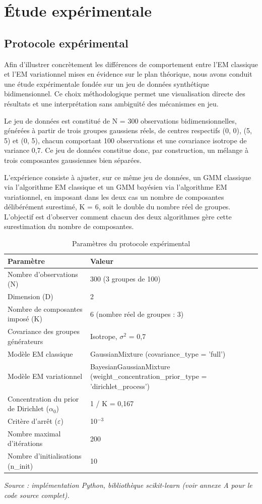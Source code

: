 \section{Étude expérimentale}
\subsection{Protocole expérimental}
Afin d'illustrer concrètement les différences de comportement entre l'EM classique et l'EM variationnel mises en évidence sur le plan théorique, nous avons conduit une étude expérimentale fondée sur un jeu de données synthétique bidimensionnel. Ce choix méthodologique permet une visualisation directe des résultats et une interprétation sans ambiguïté des mécanismes en jeu.

Le jeu de données est constitué de N = 300 observations bidimensionnelles, générées à partir de trois groupes gaussiens réels, de centres respectifs (0, 0), (5, 5) et (0, 5), chacun comportant 100 observations et une covariance isotrope de variance 0,7. Ce jeu de données constitue donc, par construction, un mélange à trois composantes gaussiennes bien séparées.

L'expérience consiste à ajuster, sur ce même jeu de données, un GMM classique via l'algorithme EM classique et un GMM bayésien via l'algorithme EM variationnel, en imposant dans les deux cas un nombre de composantes délibérément surestimé, K = 6, soit le double du nombre réel de groupes. L'objectif est d'observer comment chacun des deux algorithmes gère cette surestimation du nombre de composantes.

\begin{table}[H]
\centering
\small
\setlength{\tabcolsep}{0.14cm}
\begin{tabular}{|p{7.42cm}|p{7.42cm}|}
\hline
\textbf{Paramètre} & \textbf{Valeur} \\
\hline
Nombre d'observations (N) & 300 (3 groupes de 100) \\
\hline
Dimension (D) & 2 \\
\hline
Nombre de composantes imposé (K) & 6 (nombre réel de groupes : 3) \\
\hline
Covariance des groupes générateurs & Isotrope, $\sigma ^{2}$ = 0,7 \\
\hline
Modèle EM classique & GaussianMixture (covariance\_type = 'full') \\
\hline
Modèle EM variationnel & BayesianGaussianMixture (weight\_concentration\_prior\_type = 'dirichlet\_process') \\
\hline
Concentration du prior de Dirichlet ($\alpha _{0}$) & 1 / K = 0,167 \\
\hline
Critère d'arrêt ($\varepsilon $) & 10$^{-3}$ \\
\hline
Nombre maximal d'itérations & 200 \\
\hline
Nombre d'initialisations (n\_init) & 10 \\
\hline
\end{tabular}
\caption{Paramètres du protocole expérimental}
\label{tab:2_4}
\end{table}
\emph{Source : implémentation Python, bibliothèque scikit-learn (voir annexe A pour le code source complet).}

